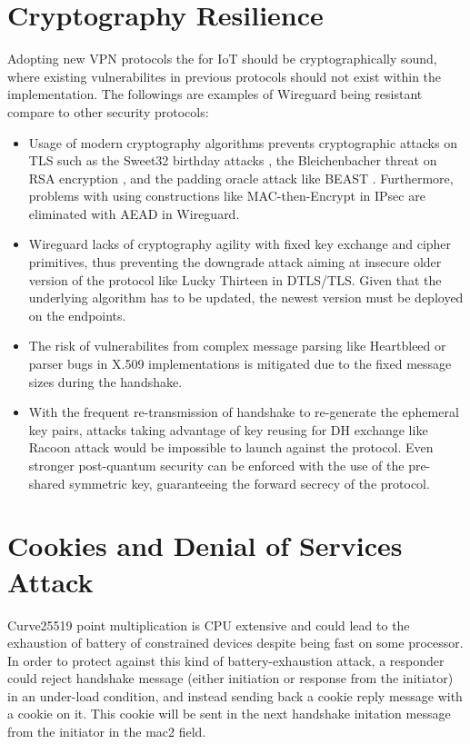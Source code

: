 \section{Cryptography Resilience} \label{iot:crypt}
  Adopting new VPN protocols the for IoT should be cryptographically sound, where existing
  vulnerabilites in previous protocols should not exist within the implementation. The followings
  are examples of Wireguard being resistant compare to other security protocols:
  \begin{itemize}
    \item Usage of modern cryptography algorithms prevents cryptographic attacks on TLS
    such as the Sweet32 birthday attacks \cite{sweet32}, the Bleichenbacher threat on RSA encryption \cite{bleichen}, 
    and the padding oracle attack like BEAST \cite{beast}.  Furthermore, problems with using
    constructions like MAC-then-Encrypt in IPsec \cite{ipsec_conf} are eliminated with AEAD in Wireguard.
    \item Wireguard lacks of cryptography agility \cite{boring} with fixed key exchange and cipher 
    primitives, thus preventing the  downgrade attack aiming at insecure older version of the 
    protocol like Lucky Thirteen \cite{lucky} in DTLS/TLS. Given that the underlying algorithm has 
    to be updated, the newest version must be deployed on the endpoints.
    \item The risk of vulnerabilites from complex message parsing like Heartbleed \cite{heartbleed} 
    or parser bugs in X.509 implementations \cite{x509} is mitigated due to the fixed message sizes 
    during the handshake.
    \item With the frequent re-transmission of handshake to re-generate the ephemeral key pairs, 
    attacks taking advantage of key reusing for DH exchange like Racoon attack \cite{raccoon} would be impossible 
    to launch against the protocol. Even stronger post-quantum security can be enforced with the 
    use of the pre-shared symmetric key, guaranteeing the forward secrecy of the protocol.
  \end{itemize}
\section{Cookies and Denial of Services Attack} \label{iot:cookie}
  Curve25519 point multiplication is  CPU extensive \cite{wireguard} and could lead to
  the exhaustion of battery of constrained devices despite being fast on some processor. In order to
  protect against this kind of battery-exhaustion attack, a responder could reject handshake message (either
  initiation or response from the initiator) in an under-load condition, and instead sending back
  a cookie reply message with a cookie on it. This cookie will be sent in the next handshake initation
  message from the initiator in the mac2 field.
  
